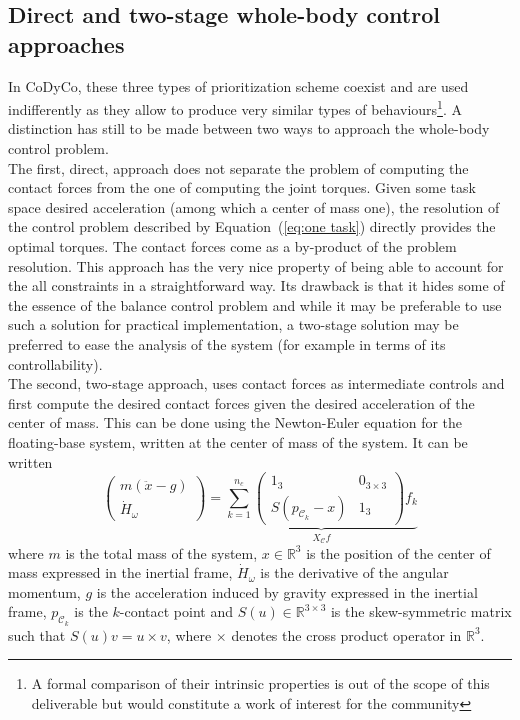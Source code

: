 \documentclass[12pt,a4paper,twoside]{article}
\begin{document}
\subsection{Direct and two-stage whole-body control approaches}

In CoDyCo, these three types of prioritization scheme coexist and are used indifferently as they allow to produce very similar types of behaviours\footnote{A formal comparison of their intrinsic properties is out of the scope of this deliverable but would constitute a work of interest for the community}. A distinction has still to be made between two ways to approach the whole-body control problem.\\

The first, direct, approach does not separate the problem of computing the contact forces from the one of computing the joint torques. Given some task space desired acceleration (among which a center of mass one), the resolution of the control problem described by Equation~(\ref{eq:one task}) directly provides the optimal torques. The contact forces come as a by-product of the problem resolution. This approach has the very nice property of being able to account for the all constraints in a straightforward way. Its drawback is that it hides some of the essence of the balance control problem and while it may be preferable to use such a solution for practical implementation, a two-stage solution may be preferred to ease the analysis of the system (for example in terms of its controllability).\\

The second, two-stage approach, uses contact forces as intermediate controls and first compute the desired contact forces given the desired acceleration of the center of mass. This can be done using the Newton-Euler equation for the floating-base system, written at the center of mass of the system. It can be written
\begin{equation}
\label{equ:NE equation}
\left( \begin{array}{c}
m (\ddot{x}-g)\\ 
\dot{H}_{\omega}
\end{array}\right) =
\underbrace{\sum_{k=1}^{n_c} \left(\begin{array}{cc}
1_{3} & 0_{3\times 3} \\
S(p_{\mathcal{C}_k} - x) & 1_{3}
\end{array}\right)  f_k}_{X_{\mathcal{C}} f}
\end{equation}
where $m$ is the total mass of the system, $x \in \mathbb{R}^3$ is the position of the center of mass expressed in the inertial frame, $\dot{H}_{\omega}$ is the derivative of the angular momentum, $g$ is the acceleration induced by gravity expressed in the inertial frame, $p_{\mathcal{C}_k}$ is the $k$-contact point and $S(u) \in \mathbb{R}^{3\times 3}$ is the skew-symmetric matrix such that $S(u)v = u \times v$, where $\times$ denotes the cross product operator in $\mathbb{R}^3$.\\
\end{document}
